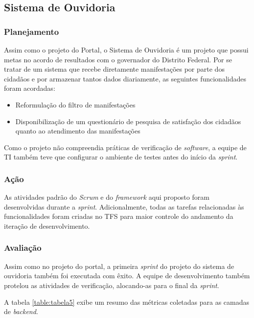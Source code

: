\clearpage

\subsection{Sistema de Ouvidoria}

\subsubsection{Planejamento}

Assim como o projeto do Portal, o Sistema de Ouvidoria é um projeto que possui metas no acordo de resultados com o governador do Distrito Federal. Por se tratar de um sistema que recebe diretamente manifestações por parte dos cidadãos e por armazenar tantos dados diariamente, as seguintes funcionalidades foram acordadas:

\begin{itemize}
	\item Reformulação do filtro de manifestações
	\item Disponibilização de um questionário de pesquisa de satisfação dos cidadãos quanto ao atendimento das manifestações
\end{itemize}

Como o projeto não compreendia práticas de verificação de \textit{software}, a equipe de TI também teve que configurar o ambiente de testes antes do início da \textit{sprint}.

\subsubsection{Ação}

As atividades padrão do \textit{Scrum} e do \textit{framework} aqui proposto foram desenvolvidas durante a \textit{sprint}. Adicionalmente, todas as tarefas relacionadas às funcionalidades foram criadas no TFS para maior controle do andamento da iteração de desenvolvimento.

\subsubsection{Avaliação}

Assim como no projeto do portal, a primeira \textit{sprint} do projeto do sistema de ouvidoria também foi executada com êxito. A equipe de desenvolvimento também protelou as atividades de verificação, alocando-as para o final da \textit{sprint}.

A tabela \ref{table:tabela5} exibe um resumo das métricas coletadas para as camadas de \textit{backend}.

